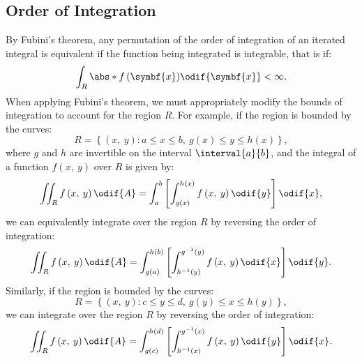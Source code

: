 \documentclass{article}
\begin{document}
\subsection{Order of Integration}
By Fubini's theorem, any permutation of the order of integration of an
iterated integral is equivalent if the function being integrated is
integrable, that is if:
\begin{equation*}
    \int_R \abs*{f\left( \symbf{x} \right)} \odif{\symbf{x}} < \infty.
\end{equation*}
When applying Fubini's theorem, we must appropriately modify the bounds
of integration to account for the region \(R\). For example, if the region
is bounded by the curves:
\begin{equation*}
    R = \left\{ \left( x, \: y \right) : a \leqslant x \leqslant b, \: g\left( x \right) \leqslant y \leqslant h\left( x \right) \right\},
\end{equation*}
where \(g\) and \(h\) are invertible on the interval \(\interval{a}{b}\),
and the integral of a function \(f\left( x, \: y \right)\) over \(R\)
is given by:
\begin{equation*}
    \iint_R f\left( x, \: y \right) \odif{A} = \int_a^b \left[ \int_{g\left( x \right)}^{h\left( x \right)} f\left( x, \: y \right) \odif{y} \right] \odif{x},
\end{equation*}
we can equivalently integrate over the region \(R\) by reversing the
order of integration:
\begin{equation*}
    \iint_R f\left( x, \: y \right) \odif{A} = \int_{g\left( a \right)}^{h\left( b \right)} \left[ \int_{h^{-1}\left( y \right)}^{g^{-1}\left( y \right)} f\left( x, \: y \right) \odif{x} \right] \odif{y}.
\end{equation*}
Similarly, if the region is bounded by the curves:
\begin{equation*}
    R = \left\{ \left( x, \: y \right) : c \leqslant y \leqslant d, \: g\left( y \right) \leqslant x \leqslant h\left( y \right) \right\},
\end{equation*}
we can integrate over the region \(R\) by reversing the order of
integration:
\begin{equation*}
    \iint_R f\left( x, \: y \right) \odif{A} = \int_{g\left( c \right)}^{h\left( d \right)} \left[ \int_{h^{-1}\left( x \right)}^{g^{-1}\left( x \right)} f\left( x, \: y \right) \odif{y} \right] \odif{x}.
\end{equation*}
\end{document}
